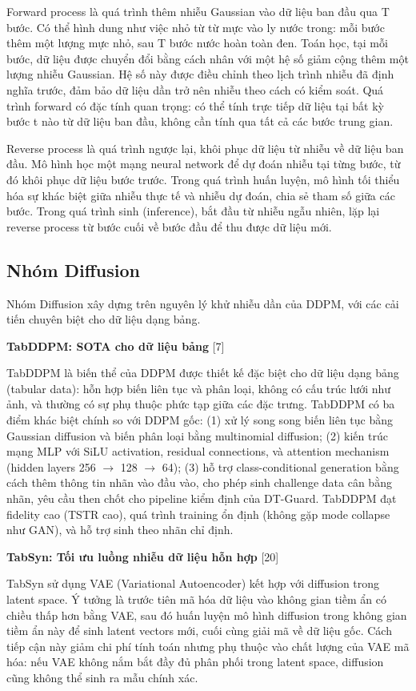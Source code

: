 Forward process là quá trình thêm nhiễu Gaussian vào dữ liệu ban đầu qua T bước. Có thể hình dung như việc nhỏ từ từ mực vào ly nước trong: mỗi bước thêm một lượng mực nhỏ, sau T bước nước hoàn toàn đen. Toán học, tại mỗi bước, dữ liệu được chuyển đổi bằng cách nhân với một hệ số giảm cộng thêm một lượng nhiễu Gaussian. Hệ số này được điều chỉnh theo lịch trình nhiễu đã định nghĩa trước, đảm bảo dữ liệu dần trở nên nhiễu theo cách có kiểm soát. Quá trình forward có đặc tính quan trọng: có thể tính trực tiếp dữ liệu tại bất kỳ bước t nào từ dữ liệu ban đầu, không cần tính qua tất cả các bước trung gian.

Reverse process là quá trình ngược lại, khôi phục dữ liệu từ nhiễu về dữ liệu ban đầu. Mô hình học một mạng neural network để dự đoán nhiễu tại từng bước, từ đó khôi phục dữ liệu bước trước. Trong quá trình huấn luyện, mô hình tối thiểu hóa sự khác biệt giữa nhiễu thực tế và nhiễu dự đoán, chia sẻ tham số giữa các bước. Trong quá trình sinh (inference), bắt đầu từ nhiễu ngẫu nhiên, lặp lại reverse process từ bước cuối về bước đầu để thu được dữ liệu mới.

\subsection{Nhóm Diffusion}
Nhóm Diffusion xây dựng trên nguyên lý khử nhiễu dần của DDPM, với các cải tiến chuyên biệt cho dữ liệu dạng bảng.

\textbf{TabDDPM: SOTA cho dữ liệu bảng} {[}7{]}

TabDDPM là biến thể của DDPM được thiết kế đặc biệt cho dữ liệu dạng bảng (tabular data): hỗn hợp biến liên tục và phân loại, không có cấu trúc lưới như ảnh, và thường có sự phụ thuộc phức tạp giữa các đặc trưng. TabDDPM có ba điểm khác biệt chính so với DDPM gốc: (1) xử lý song song biến liên tục bằng Gaussian diffusion và biến phân loại bằng multinomial diffusion; (2) kiến trúc mạng MLP với SiLU activation, residual connections, và attention mechanism (hidden layers 256 $\rightarrow$ 128 $\rightarrow$ 64); (3) hỗ trợ class-conditional generation bằng cách thêm thông tin nhãn vào đầu vào, cho phép sinh challenge data cân bằng nhãn, yêu cầu then chốt cho pipeline kiểm định của DT-Guard. TabDDPM đạt fidelity cao (TSTR cao), quá trình training ổn định (không gặp mode collapse như GAN), và hỗ trợ sinh theo nhãn chỉ định.

\textbf{TabSyn: Tối ưu luồng nhiễu dữ liệu hỗn hợp} {[}20{]}

TabSyn sử dụng VAE (Variational Autoencoder) kết hợp với diffusion trong latent space. Ý tưởng là trước tiên mã hóa dữ liệu vào không gian tiềm ẩn có chiều thấp hơn bằng VAE, sau đó huấn luyện mô hình diffusion trong không gian tiềm ẩn này để sinh latent vectors mới, cuối cùng giải mã về dữ liệu gốc. Cách tiếp cận này giảm chi phí tính toán nhưng phụ thuộc vào chất lượng của VAE mã hóa: nếu VAE không nắm bắt đầy đủ phân phối trong latent space, diffusion cũng không thể sinh ra mẫu chính xác.

